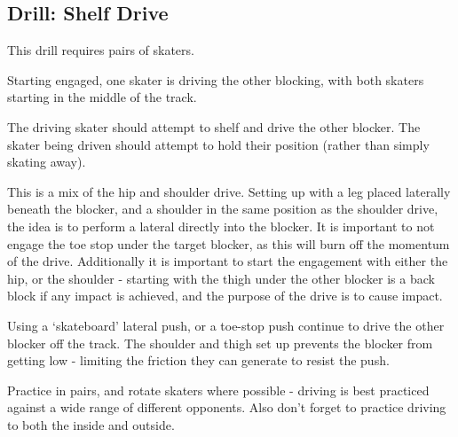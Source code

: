 \subsection*{Drill: Shelf Drive}
\label{drill:drives/shelf}

This drill requires pairs of skaters. 

Starting engaged, one skater is driving the other blocking, with both skaters starting in the middle of the track. 

The driving skater should attempt to shelf and drive the other blocker. 
The skater being driven should attempt to hold their position (rather than simply skating away).


This is a mix of the hip and shoulder drive.
Setting up with a leg placed laterally beneath the blocker, and a shoulder in the same position as the shoulder drive, the idea is to perform a lateral directly into the blocker. 
It is important to not engage the toe stop under the target blocker, as this will burn off the momentum of the drive.
Additionally it is important to start the engagement with either the hip, or the shoulder - starting with the thigh under the other blocker is a back block if any impact is achieved, and the purpose of the drive is to cause impact.


Using a `skateboard' lateral push, or a toe-stop push continue to drive the other blocker off the track.
The shoulder and thigh set up prevents the blocker from getting low - limiting the friction they can generate to resist the push.



Practice in pairs, and rotate skaters where possible - driving is best practiced against a wide range of different opponents.
Also don't forget to practice driving to both the inside and outside.




